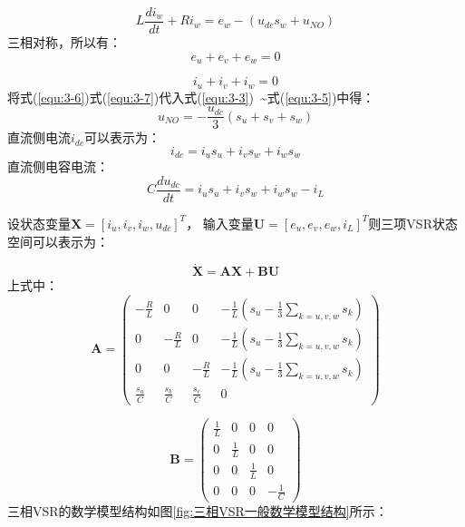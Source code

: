 \begin{equation}
	L\frac{di_{w}}{dt}+Ri_{w}=e_{w}-(u_{dc}s_{w}+u_{NO})
	\label{equ:3-5}
\end{equation}
三相对称，所以有：
\begin{equation}
	e_{u}+e_{v}+e_{w}=0
	\label{equ:3-6}
\end{equation}

\begin{equation}
	i_{u}+i_{v}+i_{w}=0 
	\label{equ:3-7}
\end{equation}
将式(\ref{equ:3-6})式(\ref{equ:3-7})代入式(\ref{equ:3-3})~\~{}式(\ref{equ:3-5})中得：
\begin{equation}
	u_{NO}=-\frac{u_{dc}}{3} \left ( s_{u}+s_{v}+s_{w}  \right )
\end{equation}
直流侧电流$i_{dc}$可以表示为：
\begin{equation}
	i_{dc}=i_{u}s_{u}+i_{v}s_{w}+i_{w}s_{w}
\end{equation}
直流侧电容电流：
\begin{equation}
	C\frac{du_{dc}}{dt}=i_{u}s_{u}+i_{v}s_{w}+i_{w}s_{w}-i_{L}
\end{equation}

设状态变量$\boldsymbol{X}=[i_{u},i_{v},i_{w},u_{dc}]^{T}$，
输入变量$\boldsymbol{U}=[e_{u},e_{v},e_{w},i_{L}]^{T}$则三项VSR状态空间可以表示为：

\begin{equation}
	\boldsymbol{\dot{X}}=\boldsymbol{AX}+\boldsymbol{BU}
\end{equation}
上式中：
\begin{equation}
	\boldsymbol{A}=
	\begin{pmatrix}
		-\frac{R}{L}    & 0               & 0               & -\frac{1}{L}  ( s_{u}-\frac{1}{3} \sum\limits_{k=u,v,w} s_{k}  ) \\
		0               & -\frac{R}{L}    & 0               & -\frac{1}{L}  ( s_{u}-\frac{1}{3} \sum\limits_{k=u,v,w} s_{k}  ) \\
		0               & 0               & -\frac{R}{L}    & -\frac{1}{L}  ( s_{u}-\frac{1}{3} \sum\limits_{k=u,v,w} s_{k}  ) \\
		\frac{s_{a}}{C} & \frac{s_{b}}{C} & \frac{s_{c}}{C} & 0
	\end{pmatrix}
\end{equation}

\begin{equation}
	\boldsymbol{B}=
	\begin{pmatrix}
		\frac{1}{L} & 0           & 0           & 0            \\
		0           & \frac{1}{L} & 0           & 0            \\
		0           & 0           & \frac{1}{L} & 0            \\
		0           & 0           & 0           & -\frac{1}{C}
	\end{pmatrix}
\end{equation}
三相VSR的数学模型结构如图\ref{fig:三相VSR一般数学模型结构}所示：

